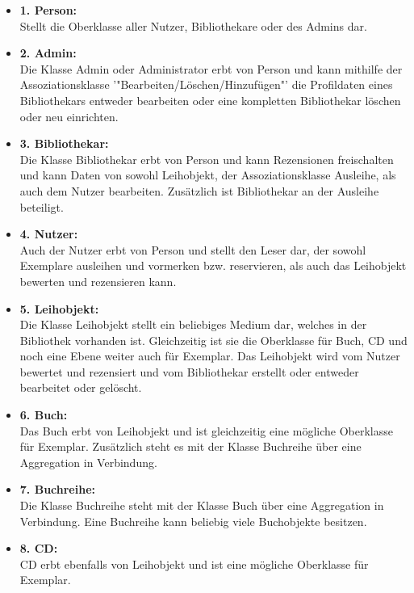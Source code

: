 \documentclass[fontsize=12pt,paper=a4,twoside]{scrartcl}
\begin{document}
\begin{itemize}
	\item \textbf{1. Person:}\\
	Stellt die Oberklasse aller Nutzer, Bibliothekare oder des Admins dar.
	
	\item \textbf{2. Admin:}\\
	Die Klasse Admin oder Administrator erbt von Person und kann mithilfe der Assoziationsklasse '"Bearbeiten/Löschen/Hinzufügen"' die Profildaten eines Bibliothekars entweder bearbeiten oder eine kompletten Bibliothekar löschen oder neu einrichten.
	
	\item \textbf{3. Bibliothekar:}\\
	Die Klasse Bibliothekar erbt von Person und kann Rezensionen freischalten und kann Daten von sowohl Leihobjekt, der Assoziationsklasse Ausleihe, als auch dem Nutzer bearbeiten. Zusätzlich ist Bibliothekar an der Ausleihe beteiligt.
	
	\item \textbf{4. Nutzer:}\\
	Auch der Nutzer erbt von Person und stellt den Leser dar, der sowohl Exemplare ausleihen und vormerken bzw. reservieren, als auch das Leihobjekt bewerten und rezensieren kann.
	
	\item \textbf{5. Leihobjekt:}\\
	Die Klasse Leihobjekt stellt ein beliebiges Medium dar, welches in der Bibliothek vorhanden ist. Gleichzeitig ist sie die Oberklasse für Buch, CD und noch eine Ebene weiter auch für Exemplar. Das Leihobjekt wird vom Nutzer bewertet und rezensiert und vom Bibliothekar erstellt oder entweder bearbeitet oder gelöscht.
	
	\item \textbf{6. Buch:}\\
	Das Buch erbt von Leihobjekt und ist gleichzeitig eine mögliche Oberklasse für Exemplar. Zusätzlich steht es mit der Klasse Buchreihe über eine Aggregation in Verbindung. 
	
	\item \textbf{7. Buchreihe:}\\
	Die Klasse Buchreihe steht mit der Klasse Buch über eine Aggregation in Verbindung. Eine Buchreihe kann beliebig viele Buchobjekte besitzen.
	
	\item \textbf{8. CD:}\\
	CD erbt ebenfalls von Leihobjekt und ist eine mögliche Oberklasse für Exemplar.
	

\end{itemize}
\end{document}
